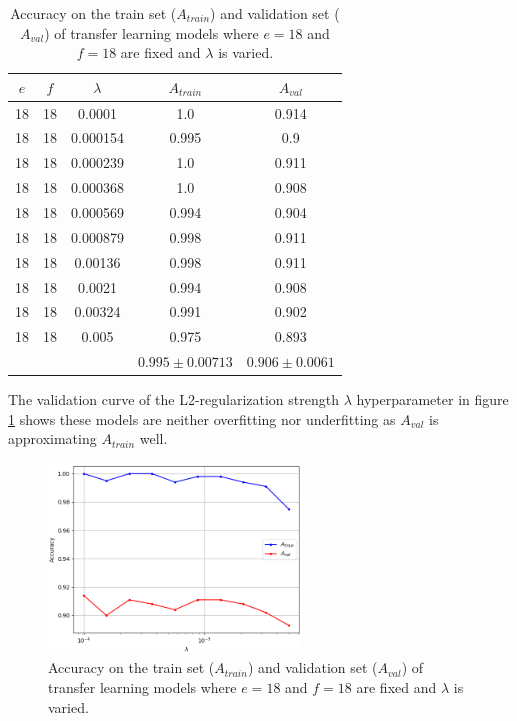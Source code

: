 \begin{table}[ht]
\centering
\begin{tabular}{ |c|c|c|c|c| }
\hline
$e$ & $f$ & $\lambda$ & $A_{train}$ & $A_{val}$ \\
\hline
18 & 18 & 0.0001 & 1.0 & 0.914 \\
18 & 18 & 0.000154 & 0.995 & 0.9 \\
18 & 18 & 0.000239 & 1.0 & 0.911 \\
18 & 18 & 0.000368 & 1.0 & 0.908 \\
18 & 18 & 0.000569 & 0.994 & 0.904 \\
18 & 18 & 0.000879 & 0.998 & 0.911 \\
18 & 18 & 0.00136 & 0.998 & 0.911 \\
18 & 18 & 0.0021 & 0.994 & 0.908 \\
18 & 18 & 0.00324 & 0.991 & 0.902 \\
18 & 18 & 0.005 & 0.975 & 0.893 \\
\hline
 & & & $0.995\pm0.00713$ & $0.906\pm0.0061$ \\
\hline
\end{tabular}
\caption{Accuracy on the train set ($A_{train}$) and validation set ($A_{val}$) of transfer learning models where $e = 18$ and $f = 18$ are fixed and $\lambda$ is varied.}
\label{table:vgg16_total}
\end{table}

The validation curve of the L2-regularization strength $\lambda$ hyperparameter in figure \ref{fig:vgg16_total_lambda} shows these models are neither overfitting nor underfitting as $A_{val}$ is approximating $A_{train}$ well.

\begin{figure}[ht]
    \centering
    \includegraphics[width=0.6\textwidth]{figs/vgg16_total_lambda.png}
    \caption{Accuracy on the train set ($A_{train}$) and validation set ($A_{val}$) of transfer learning models where $e = 18$ and $f = 18$ are fixed and $\lambda$ is varied.}
    \label{fig:vgg16_total_lambda}
\end{figure}

